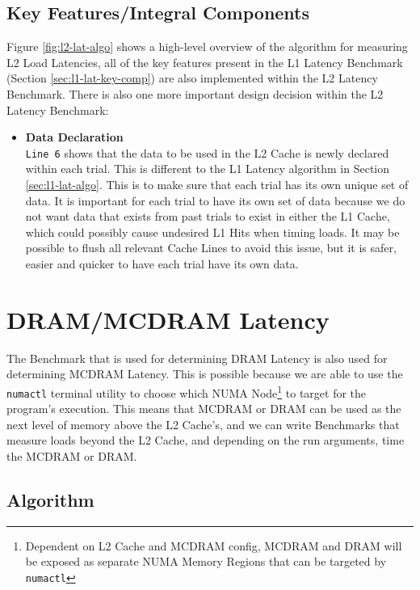 \documentclass[bsc,frontabs,twoside,singlespacing,parskip,deptreport]{infthesis}     %
\begin{document}
\subsection{Key Features/Integral Components}\label{sec:l2-lat-key-comp}
Figure \ref{fig:l2-lat-algo} shows a high-level overview of the algorithm for measuring L2 Load Latencies, all of the key features present in the L1 Latency Benchmark (Section \ref{sec:l1-lat-key-comp}) are also implemented within the L2 Latency Benchmark. There is also one more important design decision within the L2 Latency Benchmark:
\begin{itemize}
    \item{{\bf Data Declaration} \\
    \texttt{Line 6} shows that the data to be used in the L2 Cache is newly declared within each trial. This is different to the L1 Latency algorithm in Section \ref{sec:l1-lat-algo}. This is to make sure that each trial has its own unique set of data. It is important for each trial to have its own set of data because we do not want data that exists from past trials to exist in either the L1 Cache, which could possibly cause undesired L1 Hits when timing loads. It may be possible to flush all relevant Cache Lines to avoid this issue, but it is safer, easier and quicker to have each trial have its own data.
    }\label{data-declaration-consideration-L2}
\end{itemize}


\newpage

\section{DRAM/MCDRAM Latency}\label{mcdram-dram-benchmarks-lat}
The Benchmark that is used for determining DRAM Latency is also used for determining MCDRAM Latency. This is possible because we are able to use the \texttt{numactl}\cite{numactl_man} terminal utility to choose which NUMA Node\footnote{Dependent on L2 Cache and MCDRAM config, MCDRAM and DRAM will be exposed as separate NUMA Memory Regions that can be targeted by \texttt{numactl}} to target for the program's execution. This means that MCDRAM or DRAM can be used as the next level of memory above the L2 Cache's, and we can write Benchmarks that measure loads beyond the L2 Cache, and depending on the run arguments, time the MCDRAM or DRAM.
\subsection{Algorithm}
\end{document}
